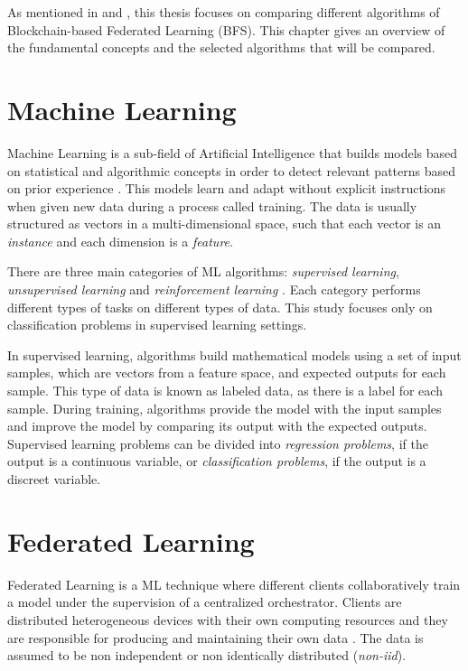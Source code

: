 As mentioned in  and , this thesis focuses on comparing different algorithms of Blockchain-based Federated Learning (BFS). This chapter gives an overview of the fundamental concepts and the selected algorithms that will be compared.

\section{Machine Learning}\label{background:machine_learning}

Machine Learning is a sub-field of Artificial Intelligence that builds models based on statistical and algorithmic concepts in order to detect relevant patterns based on prior experience \cite{geron_2019}. This models learn and adapt without explicit instructions when given new data during a process called training. The data is usually structured as vectors in a multi-dimensional space, such that each vector is an \textit{instance} and each dimension is a \textit{feature}.

There are three main categories of ML algorithms: \textit{supervised learning}, \textit{unsupervised learning} and \textit{reinforcement learning} \cite{geron_2019}. Each category performs different types of tasks on different types of data. This study focuses only on classification problems in supervised learning settings.

In supervised learning, algorithms build mathematical models using a set of input samples, which are vectors from a feature space, and expected outputs for each sample. This type of data is known as labeled data, as there is a label for each sample. During training, algorithms provide the model with the input samples and improve the model by comparing its output with the expected outputs. Supervised learning problems can be divided into \textit{regression problems}, if the output is a continuous variable, or \textit{classification problems}, if the output is a discreet variable.

\section{Federated Learning}\label{background:federated_learning}

Federated Learning is a ML technique where different clients collaboratively train a model under the supervision of a centralized orchestrator. Clients are distributed heterogeneous devices with their own computing resources and they are responsible for producing and maintaining their own data \cite{9084352}. The data is assumed to be non independent or non identically distributed (\textit{non-iid}).

